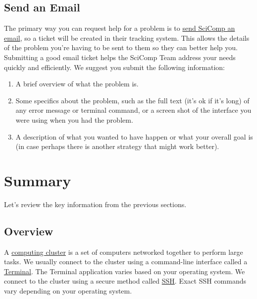 \documentclass[
]{book}
\providecommand{\tightlist}{%
  \setlength{\itemsep}{0pt}\setlength{\parskip}{0pt}}
\begin{document}
\hypertarget{send-an-email}{%
\section*{Send an Email}\label{send-an-email}}

The primary way you can request help for a problem is to \href{mailto:scicomp@fredhutch.org}{send SciComp an email}, so a ticket will be created in their tracking system. This allows the details of the problem you're having to be sent to them so they can better help you. Submitting a good email ticket helps the SciComp Team address your needs quickly and efficiently. We suggest you submit the following information:

\begin{enumerate}
\def\labelenumi{\arabic{enumi}.}
\tightlist
\item
  A brief overview of what the problem is.
\item
  Some specifics about the problem, such as the full text (it's ok if it's long) of any error message or terminal command, or a screen shot of the interface you were using when you had the problem.
\item
  A description of what you wanted to have happen or what your overall goal is (in case perhaps there is another strategy that might work better).
\end{enumerate}

\hypertarget{summary}{%
\chapter{Summary}\label{summary}}

Let's review the key information from the previous sections.

\hypertarget{overview}{%
\section{Overview}\label{overview}}

A \protect\hyperlink{what-is-a-cluster}{computing cluster} is a set of computers networked together to perform large tasks. We usually connect to the cluster using a command-line interface called a \protect\hyperlink{terminal}{Terminal}. The Terminal application varies based on your operating system. We connect to the cluster using a secure method called \protect\hyperlink{logging-in}{SSH}. Exact SSH commands vary depending on your operating system.
\end{document}
